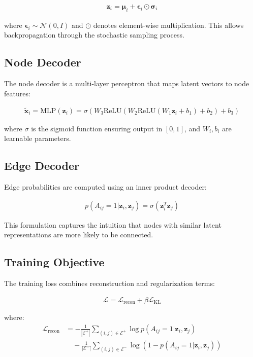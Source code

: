 \documentclass[12pt]{article}
\begin{document}
\begin{align}
\mathbf{z}_i = \boldsymbol{\mu}_i + \boldsymbol{\epsilon}_i \odot \boldsymbol{\sigma}_i
\end{align}

where $\boldsymbol{\epsilon}_i \sim \mathcal{N}(0, I)$ and $\odot$ denotes element-wise multiplication. This allows backpropagation through the stochastic sampling process.

\subsection{Node Decoder}

The node decoder is a multi-layer perceptron that maps latent vectors to node features:

\begin{align}
\tilde{\mathbf{x}}_i = \text{MLP}(\mathbf{z}_i) = \sigma(W_3 \text{ReLU}(W_2 \text{ReLU}(W_1 \mathbf{z}_i + b_1) + b_2) + b_3)
\end{align}

where $\sigma$ is the sigmoid function ensuring output in $[0,1]$, and $W_i, b_i$ are learnable parameters.

\subsection{Edge Decoder}

Edge probabilities are computed using an inner product decoder:

\begin{align}
p(A_{ij} = 1 | \mathbf{z}_i, \mathbf{z}_j) = \sigma(\mathbf{z}_i^T \mathbf{z}_j)
\end{align}

This formulation captures the intuition that nodes with similar latent representations are more likely to be connected.

\subsection{Training Objective}

The training loss combines reconstruction and regularization terms:

\begin{align}
\mathcal{L} = \mathcal{L}_{\text{recon}} + \beta \mathcal{L}_{\text{KL}}
\end{align}

where:
\begin{align}
\mathcal{L}_{\text{recon}} &= -\frac{1}{|\mathcal{E}^+|} \sum_{(i,j) \in \mathcal{E}^+} \log p(A_{ij} = 1 | \mathbf{z}_i, \mathbf{z}_j) \\
&\quad - \frac{1}{|\mathcal{E}^-|} \sum_{(i,j) \in \mathcal{E}^-} \log(1 - p(A_{ij} = 1 | \mathbf{z}_i, \mathbf{z}_j))
\end{align}
\end{document}
